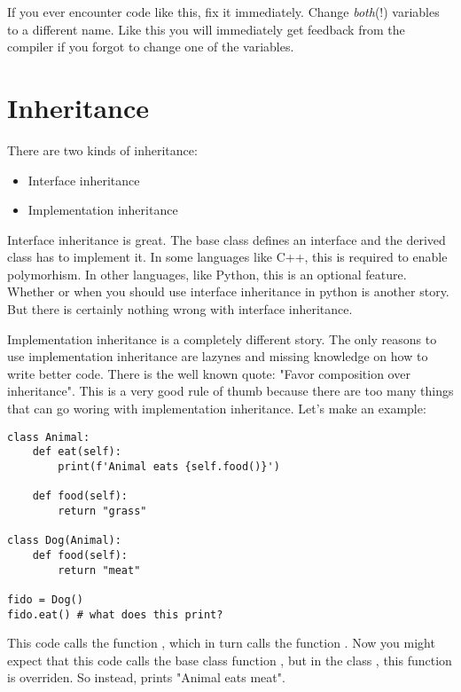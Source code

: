 If you ever encounter code like this, fix it immediately. Change \textit{both}(!) variables to a different name. Like this you will immediately get feedback from the compiler if you forgot to change one of the variables.

\section{Inheritance}

There are two kinds of inheritance:
\begin{itemize}
    \item Interface inheritance
    \item Implementation inheritance
\end{itemize}

Interface inheritance is great. The base class defines an interface and the derived class has to implement it. In some languages like C++, this is required to enable polymorhism. In other languages, like Python, this is an optional feature. Whether or when you should use interface inheritance in python is another story. But there is certainly nothing wrong with interface inheritance.

Implementation inheritance is a completely different story. The only reasons to use implementation inheritance are lazynes and missing knowledge on how to write better code. There is the well known quote: "Favor composition over inheritance". This is a very good rule of thumb because there are too many things that can go woring with implementation inheritance. Let's make an example:

\begin{programcode}{}
\begin{verbatim}
class Animal:
    def eat(self):
        print(f'Animal eats {self.food()}')

    def food(self):
        return "grass"

class Dog(Animal):
    def food(self):
        return "meat"

fido = Dog()
fido.eat() # what does this print?
\end{verbatim}
\end{programcode}

This code calls the function , which in turn calls the function . Now you might expect that this code calls the base class function , but in the class , this function is overriden. So instead,  prints "Animal eats meat".

